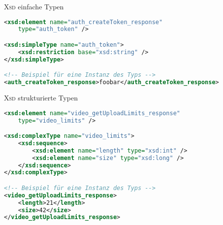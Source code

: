 \begin{frame}[fragile]{\textsc{Xsd} einfache Typen}
    \begin{lstlisting}[language=XML, label=lst:simple, caption=Beispiel für einen einfachen Schematyp aus \cite{facebookXSD}]
<xsd:element name="auth_createToken_response"
    type="auth_token" />

<xsd:simpleType name="auth_token">
    <xsd:restriction base="xsd:string" />
</xsd:simpleType>

<!-- Beispiel für eine Instanz des Typs -->
<auth_createToken_response>foobar</auth_createToken_response>
    \end{lstlisting}
\end{frame}

\begin{frame}[fragile]{\textsc{Xsd} strukturierte Typen}
    \begin{lstlisting}[language=XML, label=lst:complex, caption=Beispiel für einen strukturierten Schematyp aus \cite{facebookXSD}]
<xsd:element name="video_getUploadLimits_response"
    type="video_limits" />

<xsd:complexType name="video_limits">
    <xsd:sequence>
        <xsd:element name="length" type="xsd:int" />
        <xsd:element name="size" type="xsd:long" />
    </xsd:sequence>
</xsd:complexType>

<!-- Beispiel für eine Instanz des Typs -->
<video_getUploadLimits_response>
    <length>21</length>
    <size>42</size>
</video_getUploadLimits_response>
    \end{lstlisting}
\end{frame}